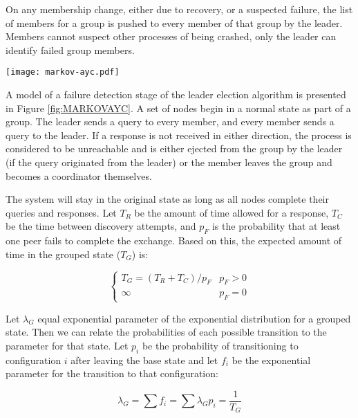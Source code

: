 On any membership change, either due to recovery, or a suspected failure, the list of members for a group is pushed to every member of that group by the leader. Members cannot suspect other processes of being crashed, only the leader can identify failed group members.

\begin{figure*}
\centering
\texttt{[image: markov-ayc.pdf]}
\caption{A diagram showing a partial Markov chain for failure detection}
\label{fig:MARKOVAYC}
\end{figure*}

A model of a failure detection stage of the leader election algorithm is presented in Figure \ref{fig:MARKOVAYC}. A set of nodes begin in a normal state as part of a group. The leader sends a query to every member, and every member sends a query to the leader. If a response is not received in either direction, the process is considered to be unreachable and is either ejected from the group by the leader (if the query originated from the leader) or the member leaves the group and becomes a coordinator themselves.

The system will stay in the original state as long as all nodes complete their queries and responses. Let $T_{R}$ be the amount of time allowed for a response, $T_{C}$ be the time between discovery attempts, and $p_{F}$ is the probability that at least one peer fails to complete the exchange. Based on this, the expected amount of time in the grouped state ($T_{G}$) is:

\begin{equation}
\begin{cases}
T_{G} = ( T_{R}+T_{C}  ) / p_{F} & p_{F} > 0 \\
\infty & p_{F} = 0
\end{cases}
\end{equation}

Let $\lambda_{G}$ equal exponential parameter of the exponential distribution for a grouped state. Then we can relate the probabilities of each possible transition to the parameter for that state. Let $p_{i}$ be the probability of transitioning to configuration $i$ after leaving the base state and let $f_{i}$ be the exponential parameter for the transition to that configuration:

\begin{equation}
\lambda_{G} = \sum f_{i} = \sum \lambda_{G} p_{i} = \frac{1}{T_{G}}
\end{equation}


